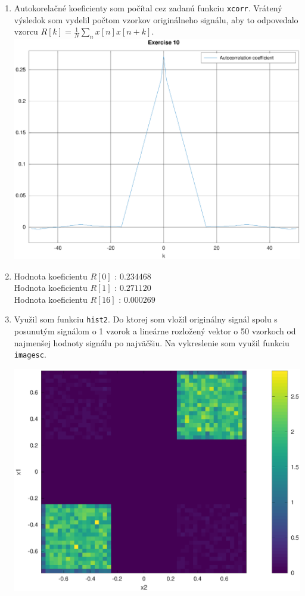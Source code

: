 \documentclass[11pt, a4paper,twocolumn]{article}
\begin{document}
\begin{enumerate}
    \item
    {
        Autokorelačné koeficienty som počítal cez zadanú funkciu \texttt{xcorr}. Vrátený výsledok som vydelil počtom vzorkov originálneho signálu, aby to odpovedalo vzorcu $ R[k] = \frac{1}{N} \sum\limits_n x[n] x[n+k] $.
        \includegraphics[width=\linewidth,keepaspectratio]{include/10.eps}
    }

    \item
    {
        Hodnota koeficientu $R[0]$ : $0.234468$\\
        Hodnota koeficientu $R[1]$ : $0.271120$\\
        Hodnota koeficientu $R[16]$ : $0.000269$
    }

    \item
    {
        Využil som funkciu \texttt{hist2}. Do ktorej som vložil originálny signál spolu s posunutým signálom o 1 vzorok a lineárne rozložený vektor o 50 vzorkoch od najmenšej hodnoty signálu po najväčšiu. Na vykreslenie som využil funkciu \texttt{imagesc}.
        \begin{center}
        \includegraphics[width=\linewidth,keepaspectratio]{include/12.eps}
        \end{center}
    }


\end{enumerate}
\end{document}
